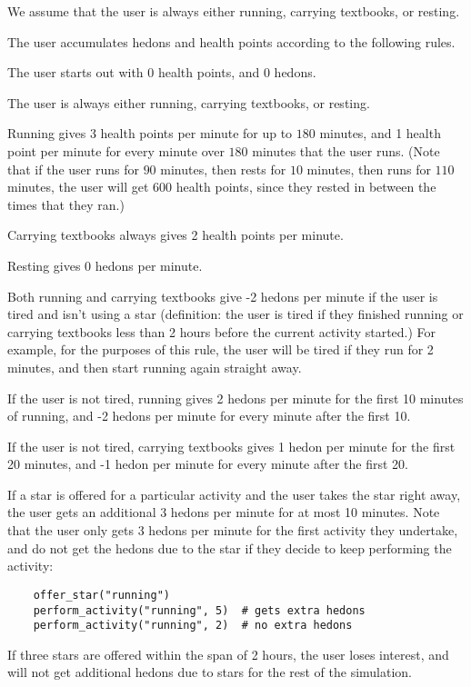 \documentclass[11pt]{article}
\let\ezimeti\itemize
\let\ezimetidne\enditemize
\renewenvironment{itemize}
   {\ezimeti
    \setlength{\topsep}{.25ex plus .125ex minus .1825ex}%
    \setlength{\itemsep}{\topsep}\setlength{\parsep}{0ex}%
    \setlength{\leftmargin}{1.75em}\setlength{\labelsep}{.5em}%
    \setlength{\labelwidth}{1.75em}\ignorespaces}
   {\ezimetidne}
\begin{document}
We assume that the user is always either running, carrying textbooks, or resting.

The user accumulates hedons and health points according to the following rules.

\begin{itemize}
	\item The user starts out with 0 health points, and 0 hedons.
	\item The user is always either running, carrying textbooks, or resting.
	\item Running gives 3 health points per minute for up to $180$ minutes, and 1 health point per minute for every minute over $180$ minutes that the user runs. (Note that if the user runs for $90$ minutes, then rests for $10$ minutes, then runs for $110$ minutes, the user will get $600$ health points, since they rested in between the times that they ran.)
	\item Carrying textbooks always gives 2 health points per minute.

	\item Resting gives 0 hedons per minute.

	\item Both running and carrying textbooks give -2 hedons per minute if the user is tired and isn't using a star (definition: the user is tired if they finished running or carrying textbooks less than 2 hours before the current activity started.) For example, for the purposes of this rule, the user will be tired if they run for 2 minutes, and then start running again straight away.
	\item If the user is not tired, running gives 2 hedons per minute for the first 10 minutes of running, and -2 hedons per minute for every minute after the first 10.
	\item If the user is not tired, carrying textbooks gives 1 hedon per minute for the first 20 minutes, and -1 hedon per minute for every minute after the first 20.

	\item If a star is offered for a particular activity and the user takes the star right away, the user gets an additional 3 hedons per minute for at most 10 minutes. Note that the user only gets 3 hedons per minute for the first activity they undertake, and do not get the hedons due to the star if they decide to keep performing the activity:
\begin{verbatim}
	offer_star("running")
	perform_activity("running", 5)  # gets extra hedons
	perform_activity("running", 2)  # no extra hedons
\end{verbatim}

	\item If three stars are offered within the span of 2 hours, the user loses interest, and will not get additional hedons due to stars for the rest of the simulation.
\end{itemize}
\end{document}

